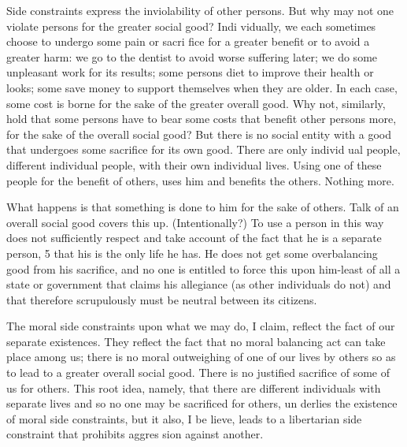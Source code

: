 \documentclass[11pt,openany]{book}
\begin{document}
Side constraints express the inviolability of other persons. But why may not one violate persons for the greater social good? Indi vidually, we each sometimes choose to undergo some pain or sacri fice for a greater benefit or to avoid a greater harm: we go to the dentist to avoid worse suffering later; we do some unpleasant work for its results; some persons diet to improve their health or looks; some save money to support themselves when they are older. In each case, some cost is borne for the sake of the greater overall good. Why not, similarly, hold that some persons have to bear some costs that benefit other persons more, for the sake of the overall social good? But there is no social entity with a good that undergoes some sacrifice for its own good. There are only individ ual people, different individual people, with their own individual lives. Using one of these people for the benefit of others, uses him and benefits the others. Nothing more. 

What happens is that something is done to him for the sake of others. Talk of an overall social good covers this up. (Intentionally?) To use a person in this way does not sufficiently respect and take account of the fact that he is a separate person, 5 that his is the only life he has. He does not get some overbalancing good from his sacrifice, and no one is entitled to force this upon him-least of all a state or government that claims his allegiance (as other individuals do not) and that therefore scrupulously must be neutral between its citizens. 

The moral side constraints upon what we may do, I claim, reflect the fact of our separate existences. They reflect the fact that no moral balancing act can take place among us; there is no moral outweighing of one of our lives by others so as to lead to a greater overall social good. There is no justified sacrifice of some of us for others. This root idea, namely, that there are different individuals with separate lives and so no one may be sacrificed for others, un derlies the existence of moral side constraints, but it also, I be lieve, leads to a libertarian side constraint that prohibits aggres sion against another. 
\end{document}
